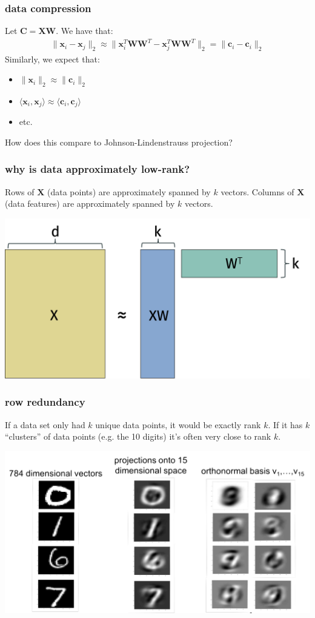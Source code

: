 \documentclass[compress]{beamer}
\newcommand{\bv}[1]{\mathbf{#1}}
\begin{document}
\begin{frame}
	\frametitle{data compression}
	Let $\bv{C} = \bv{XW}$. We have that:
	\begin{align*}
		\|\bv{x}_i - \bv{x}_j\|_2 \approx \|\bv{x}_i^T\bv{WW}^T- \bv{x}_j^T\bv{WW}^T\|_2 = \|\bv{c}_i - \bv{c}_i\|_2
	\end{align*}
Similarly, we expect that:
\begin{itemize}
	\item $\|\bv{x}_i\|_2 \approx \|\bv{c}_i\|_2$
	\item $\langle \bv{x}_i, \bv{x}_j \rangle \approx \langle \bv{c}_i, \bv{c}_j \rangle$
	\item etc.
\end{itemize}
\begin{center}
	\alert{How does this compare to Johnson-Lindenstrauss projection?}
\end{center}
\end{frame}

\begin{frame}
	\frametitle{why is data approximately low-rank?}
	Rows of $\bv{X}$ (data points) are approximately spanned by $k$ vectors. Columns of $\bv{X}$ (data features) are approximately spanned by $k$ vectors.
	\begin{center}
		\includegraphics[width=.5\textwidth]{dualview.png}
	\end{center}
\end{frame}

\begin{frame}
	\frametitle{row redundancy}
	If a data set only had $k$ unique data points, it would be exactly rank $k$. If it has $k$ ``clusters'' of data points (e.g. the 10 digits) it's often very close to rank $k$. 
	\begin{center}
		\includegraphics[width=.6\textwidth]{rowview.png}
	\end{center}
\end{frame}
\end{document}
